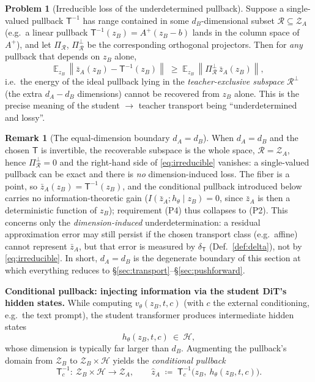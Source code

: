\documentclass[11pt,a4paper]{article}
\newcommand{\E}{\mathbb{E}}
\newcommand{\Za}{\mathcal{Z}_{A}}
\newcommand{\Zb}{\mathcal{Z}_{B}}
\newcommand{\Tmap}{\mathsf{T}}
\newcommand{\Tinv}{\mathsf{T}^{-1}}
\newcommand{\norm}[1]{\left\lVert #1 \right\rVert}
\theoremstyle{definition}
\newtheorem{problem}{Problem}
\newtheorem{remark}{Remark}
\begin{document}
\begin{problem}[Irreducible loss of the underdetermined pullback]
\label{prob:underdetermined}
Suppose a single-valued pullback $\Tinv$ has range contained in some $d_B$-dimensional subset
$\mathcal{R}\subseteq\Za$ (e.g.\ a linear pullback $\Tinv(z_B)=A^{+}(z_B-b)$ lands in the column
space of $A^{+}$), and let $\Pi_{\mathcal R}$, $\Pi^{\perp}_{\mathcal R}$ be the corresponding
orthogonal projectors. Then for \emph{any} pullback that depends on $z_B$ alone,
\begin{equation}
\E_{z_B}\,\norm{\bar z_A(z_B)-\Tinv(z_B)}
\;\ge\;
\E_{z_B}\,\norm{\Pi^{\perp}_{\mathcal R}\,\bar z_A(z_B)},
\label{eq:irreducible}
\end{equation}
i.e.\ the energy of the ideal pullback lying in the \emph{teacher-exclusive subspace}
$\mathcal{R}^{\perp}$ (the extra $d_A-d_B$ dimensions) cannot be recovered from $z_B$ alone. This
is the precise meaning of the student $\to$ teacher transport being ``underdetermined and lossy''.
\end{problem}

\begin{remark}[The equal-dimension boundary $d_A=d_B$]
\label{rem:equal-dim}
When $d_A=d_B$ and the chosen $\Tmap$ is invertible, the recoverable subspace is the whole space,
$\mathcal{R}=\Za$, hence $\Pi^{\perp}_{\mathcal R}=0$ and the right-hand side of
\eqref{eq:irreducible} vanishes: a single-valued pullback can be exact and there is \emph{no}
dimension-induced loss. The fiber is a point, so $\bar z_A(z_B)=\Tinv(z_B)$, and the conditional
pullback introduced below carries no information-theoretic gain
($I(\bar z_A;h_\theta\mid z_B)=0$, since $\bar z_A$ is then a deterministic function of $z_B$);
requirement (P4) thus collapses to (P2). This concerns only the \emph{dimension-induced}
underdetermination: a residual approximation error may still persist if the chosen transport class
(e.g.\ affine) cannot represent $\bar z_A$, but that error is measured by $\delta_{\Tmap}$
(Def.~\ref{def:delta}), not by \eqref{eq:irreducible}. In short, $d_A=d_B$ is the degenerate
boundary of this section at which everything reduces to \S\ref{sec:transport}--\S\ref{sec:pushforward}.
\end{remark}

\textbf{Conditional pullback: injecting information via the student DiT's hidden states.}
While computing $v_\theta(z_B,t,c)$ (with $c$ the external conditioning, e.g.\ the text prompt),
the student transformer produces intermediate hidden states
\[
h_\theta(z_B,t,c)\ \in\ \mathcal{H},
\]
whose dimension is typically far larger than $d_B$. Augmenting the pullback's domain from $\Zb$
to $\Zb\times\mathcal{H}$ yields the \emph{conditional pullback}
\begin{equation}
\Tinv_{c}:\ \Zb\times\mathcal{H}\to\Za,
\qquad
\hat z_A\;\coloneqq\;\Tinv_{c}\big(z_B,\ h_\theta(z_B,t,c)\big).
\label{eq:cond-pullback}
\end{equation}
\end{document}
